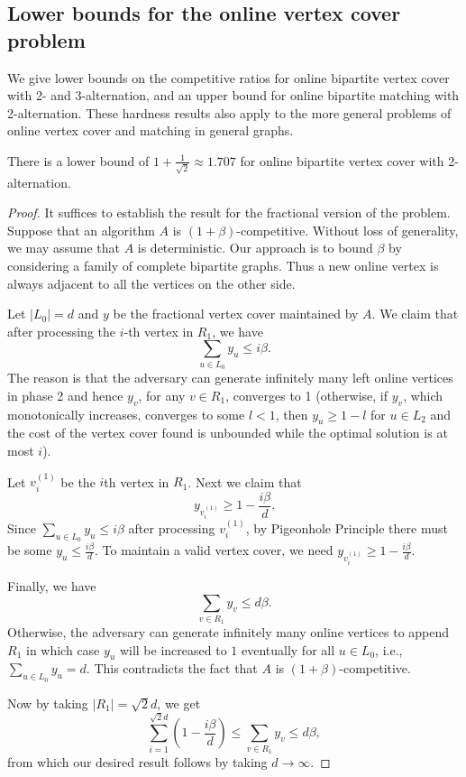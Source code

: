 \documentclass{article}
\begin{document}
\subsection{Lower bounds for the online vertex cover problem}

We give lower bounds on the competitive ratios for online bipartite vertex cover with 2- and 3-alternation, and an upper bound for online bipartite matching with 2-alternation. These hardness results also apply to the more general problems of online vertex cover and matching in general graphs.
\begin{proposition}
There is a lower bound of $1+\frac{1}{\sqrt{2}}\approx 1.707$
for online bipartite vertex cover with 2-alternation.
\end{proposition}
\begin{proof}
It suffices to establish the result for the fractional version of the problem. Suppose that an algorithm $A$ is $(1+\beta)$-competitive. 
Without loss of generality, we may assume that $A$ is deterministic.
Our approach is to bound $\beta$ by considering a family of complete bipartite graphs. Thus a new online vertex is always adjacent to all the vertices on the other side.

Let $|L_0|=d$ and $y$ be the fractional vertex cover maintained by $A$. 
We claim that after processing the $i$-th vertex in $R_1$, we have
$$\sum_{u\in L_0} y_u\leq i\beta.$$ 
The reason is that the adversary can generate infinitely many left online vertices in phase 2 and hence $y_v$, for any $v\in R_1$, converges to 1 (otherwise, if $y_v$, which monotonically increases, converges to some $l<1$, then $y_u\geq 1-l$ for $u\in L_2$ and the cost of the vertex cover found is unbounded while the optimal solution is at most $i$).


Let $v_i^{(1)}$ be the $i$th vertex in $R_1$. Next we claim that $$y_{v_{i}^{(1)}}\geq 1-\frac{i\beta}{d}.$$ Since $\sum_{u\in L_0} y_u\leq i\beta$ after processing $v_{i}^{(1)}$, by Pigeonhole Principle there must be some $y_u\leq \frac{i\beta}{d}$. To maintain a valid vertex cover, we need $y_{v_{i}^{(1)}}\geq 1-\frac{i\beta}{d}$.

Finally, we have 
\begin{equation}
\label{[eqn:yv]}
\sum_{v\in R_1} y_v\leq d\beta.
\end{equation}
Otherwise, the adversary can generate infinitely many online vertices to append $R_1$ in which case 
$y_u$ will be increased to $1$ eventually for all $u\in L_0$, i.e., $\sum_{u\in L_0}y_u = d$.
This contradicts the fact that $A$ is $(1+\beta)$-competitive.

Now by taking $|R_1|=\sqrt{2}d$, we get$$\sum_{i=1}^{\sqrt{2}d}\left( 1-\frac{i\beta}{d}\right) \leq\sum_{v\in R_1} y_v\leq d\beta ,$$
from which our desired result follows by taking $d\longrightarrow\infty$.
\end{proof}
\end{document}
